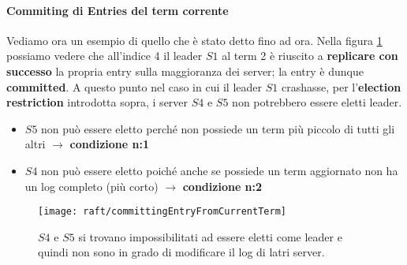   \paragraph{Commiting di Entries del term corrente}
  Vediamo ora un esempio di quello che è stato detto fino ad ora. Nella figura \ref{fig:figure11} possiamo vedere che all'indice 4 il leader $S1$ al term 2 è riuscito a \textbf{replicare con successo} la propria entry sulla maggioranza dei server; la entry è dunque \textbf{committed}. A questo punto nel caso in cui il leader $S1$ crashasse, per l'\textbf{election restriction} introdotta sopra, i server $S4$ e $S5$ non potrebbero essere eletti leader.
  \begin{itemize}
    \item {$S5$ non può essere eletto perché non possiede un term più piccolo di tutti gli altri $\rightarrow$ \textbf{condizione n:1}}
    \item{$S4$ non può essere eletto poiché anche se possiede un term aggiornato non ha un log completo (più corto) $\rightarrow$ \textbf{condizione n:2} }
  \end{itemize}


  \begin{figure}[H]
    \centering
    \texttt{[image: raft/committingEntryFromCurrentTerm]}
    \caption[stateDiagramCaption]{$S4$ e $S5$ si trovano impossibilitati ad essere eletti come leader e quindi non sono in grado di modificare il log di latri server.}
    \label{fig:figure11}
  \end{figure}

